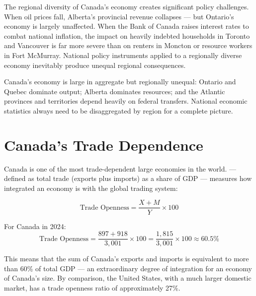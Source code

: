 The regional diversity of Canada's economy creates significant policy
challenges. When oil prices fall, Alberta's provincial revenue collapses
--- but Ontario's economy is largely unaffected. When the Bank of Canada
raises interest rates to combat national inflation, the impact on heavily
indebted households in Toronto and Vancouver is far more severe than on
renters in Moncton or resource workers in Fort McMurray. National policy
instruments applied to a regionally diverse economy inevitably produce
unequal regional consequences.

\begin{keytakeaway}
Canada's economy is large in aggregate but regionally unequal: Ontario
and Quebec dominate output; Alberta dominates resources; and the Atlantic
provinces and territories depend heavily on federal transfers. National
economic statistics always need to be disaggregated by region for a
complete picture.
\end{keytakeaway}

\section{Canada's Trade Dependence}
\label{sec:trade_dependence}

Canada is one of the most trade-dependent large economies in the world.
 --- defined as total trade (exports plus imports) as
a share of GDP --- measures how integrated an economy is with the global
trading system:

\begin{equation}
  \text{Trade Openness} = \frac{X + M}{Y} \times 100
  \label{eq:trade_openness}
\end{equation}

For Canada in 2024:
\[
\text{Trade Openness} = \frac{897 + 918}{3{,}001} \times 100 = \frac{1{,}815}{3{,}001} \times 100 \approx 60.5\%
\]

This means that the sum of Canada's exports and imports is equivalent
to more than 60\% of total GDP --- an extraordinary degree of integration
for an economy of Canada's size. By comparison, the United States, with
a much larger domestic market, has a trade openness ratio of approximately
27\%.

